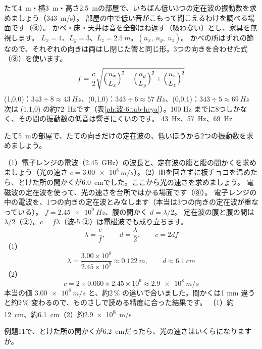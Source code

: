 \label{ph:波-6:ex10}
\begin{phreidai}[部屋のこもる音]
たて\qty{4}{m}・横\qty{3}{m}・高さ\qty{2.5}{m}の部屋で、いちばん低い3つの定在波の振動数を求めましょう（\qty{343}{m/s}）。
\phbamen
部屋の中で低い音がこもって聞こえるわけを調べる場面です（⑧）。
\phmushi
かべ・床・天井は音を全部はね返す（吸わない）とし、家具を無視します。
\phzu
$L_x=4$、$L_y=3$、$L_z=\qty{2.5}{m}$。$(n_x,\ n_y,\ n_z)$。
\phriyu
かべの所はずれの節なので、それぞれの向きは両はし閉じた管と同じ形。3つの向きを合わせた式（⑧）を使います。
\phtateru
\[f=\frac{c}{2}\sqrt{\Bigl(\frac{n_x}{L_x}\Bigr)^2+\Bigl(\frac{n_y}{L_y}\Bigr)^2+\Bigl(\frac{n_z}{L_z}\Bigr)^2}\]
\phtoku
(1,0,0)：$343\div8\approx\qty{43}{Hz}$、(0,1,0)：$343\div6\approx\qty{57}{Hz}$、(0,0,1)：$343\div5\approx\qty{69}{Hz}$
\phtashikame
次は (1,1,0) の約\qty{72}{Hz}です（表\ref{ph:波-6:tab-heya}）。100 Hz までに8つしかなく、その間の振動数の低音は響きにくいのです。
\kotae \qty{43}{Hz}、\qty{57}{Hz}、\qty{69}{Hz}
\end{phreidai}
\begin{jibun}
たて\qty{5}{m}の部屋で、たての向きだけの定在波の、低いほうから2つの振動数を求めましょう。
\end{jibun}

\label{ph:波-6:ex11}
\begin{phreidai}[電子レンジで光の速さをはかる]
（1）電子レンジの電波（\qty{2.45}{GHz}）の波長と、定在波の腹と腹の間かくを求めましょう（光の速さ $c=\qty{3.00e8}{m/s}$）。（2）皿を回さずに板チョコを温めたら、とけた所の間かくが\qty{6.0}{cm}でした。ここから光の速さを求めましょう。
\phbamen
電磁波の定在波を使って、光の速さを台所ではかる場面です（⑧）。
\phmushi
電子レンジの中の電波を、1つの向きの定在波とみなします（本当は3つの向きの定在波が重なっている）。
\phzu
$f=\qty{2.45e9}{Hz}$、腹の間かく $d=\lambda/2$。
\phriyu
定在波の腹と腹の間は $\lambda/2$（②）。$c=f\lambda$（波-5 ②）は電磁波でも成り立ちます。
\phtateru
\[\lambda=\frac{c}{f},\qquad d=\frac{\lambda}{2},\qquad c=2df\]
\phtoku
（1）\[\lambda=\frac{3.00\times10^8}{2.45\times10^9}\approx\qty{0.122}{m},\qquad d\approx\qty{6.1}{cm}\]
（2）\[c=2\times0.060\times2.45\times10^9\approx\qty{2.9e8}{m/s}\]
\phtashikame
本当の値 $\qty{3.00e8}{m/s}$ と、約2\,\% の違いで合いました。間かくは1 mm 違うと約2\,\% 変わるので、ものさしで読める精度に合った結果です。
\kotae （1）約\qty{12}{cm}、約\qty{6.1}{cm}（2）約\qty{2.9e8}{m/s}
\end{phreidai}
\begin{jibun}
例題11で、とけた所の間かくが\qty{6.2}{cm}だったら、光の速さはいくらになりますか。
\end{jibun}


